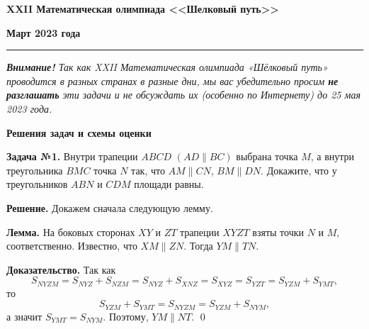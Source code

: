 \documentclass[12pt]{article}
\def\avtor#1{\linebreak[2] \hspace*{\fill}{\small (\mbox{\textit{#1})}}}
\def \Problem#1{\par \bigskip \textbf{Задача №{#1}. }}
\def \solution{\par \bigskip \textbf{Решение. }}
\def \Lemma{\par \bigskip \textbf{Лемма. }}
\def \proof{\par \bigskip \textbf{Доказательство. }}
\begin{document}
\centerline{\sc \textbf{XXII Математическая олимпиада <<Шелковый путь>>}}

\centerline{\sc \textbf{Март 2023 года}}

\bigskip
\hrule
\bigskip

\textsl{\textbf{Внимание!} 
Так как XXII Математическая олимпиада «Шёлковый путь» проводится в разных странах в разные дни, мы вас убедительно просим \textbf{не разглашать} эти задачи и не обсуждать их (особенно по Интернету) до 25 мая 2023 года.
}

\bigskip

\centerline{\sc \textbf{Решения задач и схемы оценки}}

\bigskip
\Problem{1} Внутри трапеции $ABCD$ $(AD \parallel BC)$  выбрана точка $M$, а внутри треугольника $BMC$ точка $N$ так, что $AM \parallel CN$, $BM \parallel DN$. Докажите, что у треугольников $ABN$ и $CDM$ площади равны. \avtor{Седракян~Н.}

\solution Докажем сначала следующую лемму.

\Lemma На боковых сторонах $XY$ и $ZT$ трапеции $XYZT$ взяты точки $N$ и $M$, соответственно. Известно, что $XM \parallel ZN$. Тогда $YM \parallel TN$.

\proof Так как 
$$
S_{NYZM}= S_{NYZ}+ S_{NZM}= S_{NYZ}+ S_{XNZ}= S_{XYZ} = S_{YZT}= S_{YZM}+ S_{YMT},
$$
то
$$
S_{YZM}+ S_{YMT}= S_{NYZM}= S_{YZM}+ S_{NYM},
$$
а значит $S_{YMT}= S_{NYM}$. Поэтому, $YM \parallel NT$. \qed
\end{document}
